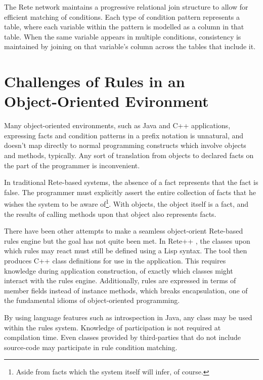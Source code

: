 \documentclass[10pt,twocolumn,letterpaper,colorhighlight]{article}
\begin{document}
The Rete network maintains a progressive relational join structure to allow for 
efficient matching of conditions.  Each type of condition pattern
represents a table, where each variable within the pattern is 
modelled as a column in that table.  When the same variable
appears in multiple conditions, consistency is maintained by joining
on that variable's column across the tables that include it.


\section{Challenges of Rules in an\\Object-Oriented Evironment}

Many object-oriented environments, such as Java and C++ applications,
expressing facts and condition patterns in a prefix notation
is unnatural, and doesn't map directly to normal programming
constructs which involve objects and methods, typically.  Any sort of
translation from objects to declared facts on the part of the
programmer is inconvenient.

In traditional Rete-based systems, the absence of a fact represents
that the fact is false. The programmer must explicitly assert the entire
collection of facts that he wishes the system to be aware
of\footnote{Aside from facts which the system itself will infer, of course.}.  With
objects, the object itself is a fact, and the results of calling
methods upon that object also represents facts.  

There have been other attempts to make a seamless object-orient
Rete-based rules engine but the goal has not quite been met. In Rete++
\cite{haley93seamless}, the classes upon which rules may react
must still be defined using a Lisp syntax.  The tool then produces C++
class definitions for use in the application.  This requires knowledge
during application construction, of exactly which classes might
interact with the rules engine.  Additionally, rules are expressed in
terms of member fields instead of instance methods, which breaks
encapsulation, one of the fundamental idioms of object-oriented
programming.

By using language features such as introspection in Java, any class
may be used within the rules system.  Knowledge of participation is
not required at compilation time.  Even classes provided by
third-parties that do not include source-code may participate in
rule condition matching.
\end{document}
